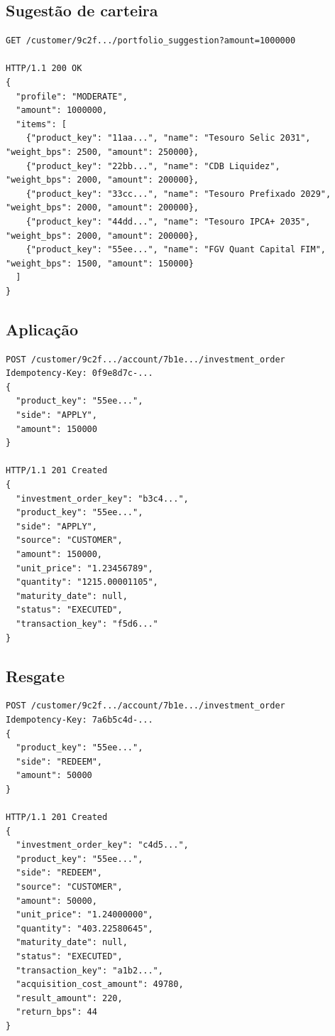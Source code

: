 \documentclass[11pt,a4paper]{article}
\begin{document}
\subsection*{Sugestão de carteira}
\begin{lstlisting}
GET /customer/9c2f.../portfolio_suggestion?amount=1000000

HTTP/1.1 200 OK
{
  "profile": "MODERATE",
  "amount": 1000000,
  "items": [
    {"product_key": "11aa...", "name": "Tesouro Selic 2031",     "weight_bps": 2500, "amount": 250000},
    {"product_key": "22bb...", "name": "CDB Liquidez",           "weight_bps": 2000, "amount": 200000},
    {"product_key": "33cc...", "name": "Tesouro Prefixado 2029", "weight_bps": 2000, "amount": 200000},
    {"product_key": "44dd...", "name": "Tesouro IPCA+ 2035",     "weight_bps": 2000, "amount": 200000},
    {"product_key": "55ee...", "name": "FGV Quant Capital FIM",  "weight_bps": 1500, "amount": 150000}
  ]
}
\end{lstlisting}

\subsection*{Aplicação}
\begin{lstlisting}
POST /customer/9c2f.../account/7b1e.../investment_order
Idempotency-Key: 0f9e8d7c-...
{
  "product_key": "55ee...",
  "side": "APPLY",
  "amount": 150000
}

HTTP/1.1 201 Created
{
  "investment_order_key": "b3c4...",
  "product_key": "55ee...",
  "side": "APPLY",
  "source": "CUSTOMER",
  "amount": 150000,
  "unit_price": "1.23456789",
  "quantity": "1215.00001105",
  "maturity_date": null,
  "status": "EXECUTED",
  "transaction_key": "f5d6..."
}
\end{lstlisting}

\subsection*{Resgate}
\begin{lstlisting}
POST /customer/9c2f.../account/7b1e.../investment_order
Idempotency-Key: 7a6b5c4d-...
{
  "product_key": "55ee...",
  "side": "REDEEM",
  "amount": 50000
}

HTTP/1.1 201 Created
{
  "investment_order_key": "c4d5...",
  "product_key": "55ee...",
  "side": "REDEEM",
  "source": "CUSTOMER",
  "amount": 50000,
  "unit_price": "1.24000000",
  "quantity": "403.22580645",
  "maturity_date": null,
  "status": "EXECUTED",
  "transaction_key": "a1b2...",
  "acquisition_cost_amount": 49780,
  "result_amount": 220,
  "return_bps": 44
}
\end{lstlisting}
\end{document}
